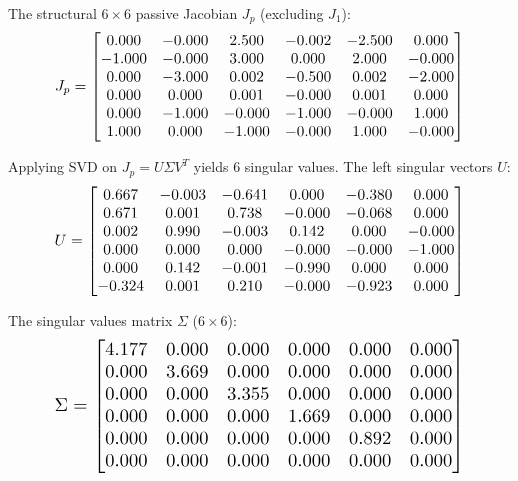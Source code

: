 \documentclass[12pt,a4paper]{article}
\begin{document}
The structural $6 \times 6$ passive Jacobian $J_p$ (excluding $J_1$):
\begin{equation}
    \resizebox{0.85\textwidth}{!}{$ J_p = \begin{bmatrix}
  0.000 & -0.000 & 2.500 & -0.002 & -2.500 & 0.000 \\
  -1.000 & -0.000 & 3.000 & 0.000 & 2.000 & -0.000 \\
  0.000 & -3.000 & 0.002 & -0.500 & 0.002 & -2.000 \\
  0.000 & 0.000 & 0.001 & -0.000 & 0.001 & 0.000 \\
  0.000 & -1.000 & -0.000 & -1.000 & -0.000 & 1.000 \\
  1.000 & 0.000 & -1.000 & -0.000 & 1.000 & -0.000
\end{bmatrix} $}
\end{equation}

Applying SVD on $J_p = U \Sigma V^T$ yields 6 singular values. The left singular vectors $U$:
\begin{equation}
    \resizebox{0.85\textwidth}{!}{$ U = \begin{bmatrix}
  0.667 & -0.003 & -0.641 & 0.000 & -0.380 & 0.000 \\
  0.671 & 0.001 & 0.738 & -0.000 & -0.068 & 0.000 \\
  0.002 & 0.990 & -0.003 & 0.142 & 0.000 & -0.000 \\
  0.000 & 0.000 & 0.000 & -0.000 & -0.000 & -1.000 \\
  0.000 & 0.142 & -0.001 & -0.990 & 0.000 & 0.000 \\
  -0.324 & 0.001 & 0.210 & -0.000 & -0.923 & 0.000
\end{bmatrix} $}
\end{equation}

The singular values matrix $\Sigma$ ($6 \times 6$):
\begin{equation}
    \resizebox{0.85\textwidth}{!}{$ \Sigma = \begin{bmatrix}
  4.177 & 0.000 & 0.000 & 0.000 & 0.000 & 0.000 \\
  0.000 & 3.669 & 0.000 & 0.000 & 0.000 & 0.000 \\
  0.000 & 0.000 & 3.355 & 0.000 & 0.000 & 0.000 \\
  0.000 & 0.000 & 0.000 & 1.669 & 0.000 & 0.000 \\
  0.000 & 0.000 & 0.000 & 0.000 & 0.892 & 0.000 \\
  0.000 & 0.000 & 0.000 & 0.000 & 0.000 & 0.000
\end{bmatrix} $}
\end{equation}
\end{document}
